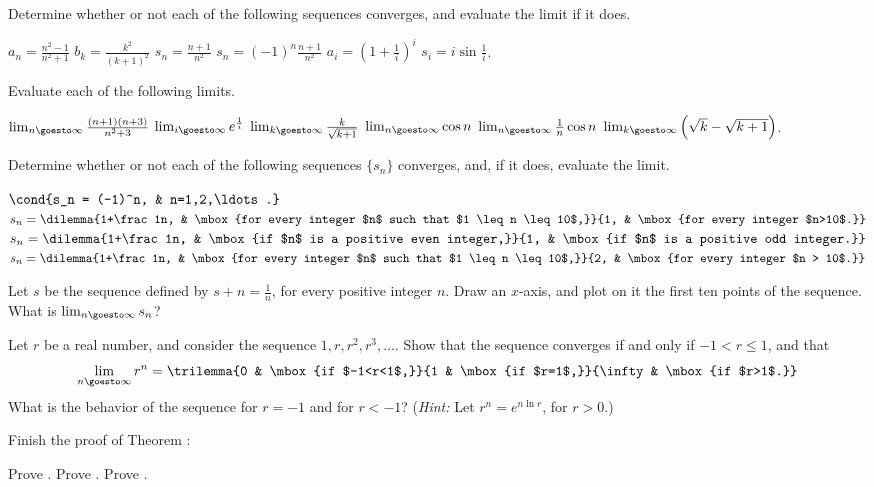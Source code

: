 \begin{exercises}

Determine whether or not each of the following
sequences converges, and evaluate
the limit if it does.
\begin{exenum}
\x
$a_n = \frac{n^2-1}{n^2+1}$
\x
$b_k = \frac{k^2}{(k+1)^2}$
\x
$s_n = \frac{n+1}{n^2}$
\x
$s_n = (-1)^n \frac{n+1}{n^2}$
\x
$a_i = \left( 1 + \frac1i \right)^i$
\x
$s_i = i \sin \frac1i$.
\end{exenum}

Evaluate each of the following limits.
\begin{exenum}
\x
$\lim_{n\goesto\infty} \frac{(n+1)(n+3)}{n^2+3}$
\x
$\lim_{i\goesto\infty} e^{\frac1i}$
\x
$\lim_{k\goesto\infty} \frac{k}{\sqrt{k+1}}$
\x
$\lim_{n\goesto\infty} \cos n$
\x
$\lim_{n\goesto\infty} \frac1n \cos n$
\x
$\lim_{k\goesto\infty} \left(\sqrt{k} - \sqrt{k+1}\right)$.
\end{exenum}

Determine whether or not each of the following
sequences $\{ s_n \}$ converges, and, if it does,
evaluate the limit.
\begin{exenum}
\x
$\cond{s_n = (-1)^n, & n=1,2,\ldots.}$
\x
$s_n = \dilemma{1+\frac1n, & \mbox{for every integer
$n$ such that $1 \leq n \leq 10$,}}
{1, & \mbox{for every integer $n>10$.}}$
\x
$s_n  = \dilemma{1+\frac1n, & \mbox{if $n$ is
a positive even integer,}}
{1, & \mbox{if $n$ is a positive odd integer.}}$
\x
$s_n = \dilemma{1+\frac1n, & \mbox{for every
integer $n$ such that $1 \leq n \leq 10$,}}
{2, & \mbox{for every integer $n > 10$.}}$
\end{exenum}

Let $s$ be the sequence defined by
$s+n = \frac1n$, for every positive integer $n$.
Draw an $x$-axis, and plot on it the first
ten points of the sequence.
What is $\lim_{n\goesto\infty} s_n$?

Let $r$ be a real number,
and consider the sequence $1, r, r^2, r^3, \ldots.$
Show that the sequence converges if and only
if $-1 < r \leq 1$, and that
\[
\lim_{n\goesto\infty} r^n =
\trilemma{0 & \mbox{if $-1<r<1$,}}
{1 & \mbox{if $r=1$,}}
{\infty & \mbox{if $r>1$.}}
\]
What is the behavior of the sequence for
$r=-1$ and for $r<-1$?
(\emph{Hint:} Let $r^n = e^{n \ln r}$,
for $r>0$.)

Finish the proof of Theorem :
\begin{exenum}
\x
Prove .
\x
Prove .
\x
Prove .
\end{exenum}


\end{exercises}
